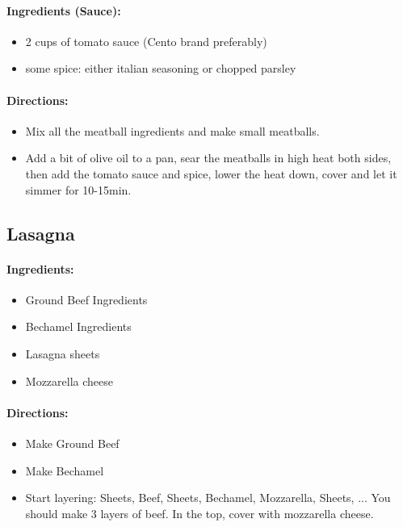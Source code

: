 \documentclass{article}
\begin{document}
\paragraph{Ingredients (Sauce):}
\begin{itemize}
	\item 2 cups of tomato sauce (Cento brand preferably)
	\item some spice: either italian seasoning or chopped parsley
\end{itemize}

\paragraph{Directions:}
\begin{itemize}
	\item Mix all the meatball ingredients and make small meatballs.
	\item Add a bit of olive oil to a pan, sear the meatballs in high heat both sides, then add the tomato sauce and spice, lower the heat down, cover and let it simmer for 10-15min.
\end{itemize}

\subsection{Lasagna}

\paragraph{Ingredients:}

\begin{itemize}
  \item Ground Beef Ingredients
  \item Bechamel Ingredients
  \item Lasagna sheets
  \item Mozzarella cheese
\end{itemize}

\paragraph{Directions:}
\begin{itemize}
  \item Make Ground Beef
  \item Make Bechamel
  \item Start layering: Sheets, Beef, Sheets, Bechamel, Mozzarella, Sheets, ... You should make 3 layers of beef. In the top, cover with mozzarella cheese.
\end{itemize}
\end{document}
